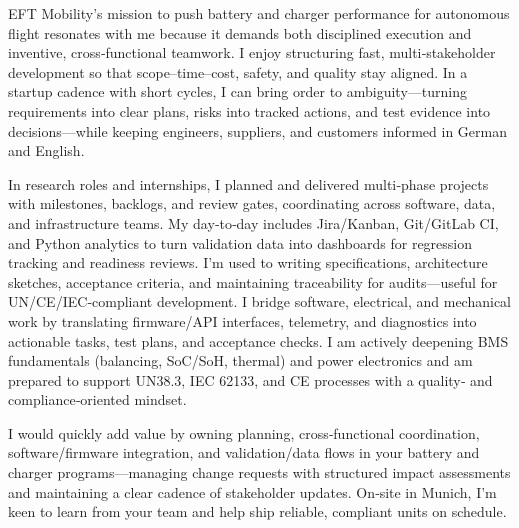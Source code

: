 EFT Mobility’s mission to push battery and charger performance for autonomous flight resonates with me because it demands both disciplined execution and inventive, cross‑functional teamwork. I enjoy structuring fast, multi‑stakeholder development so that scope–time–cost, safety, and quality stay aligned. In a startup cadence with short cycles, I can bring order to ambiguity—turning requirements into clear plans, risks into tracked actions, and test evidence into decisions—while keeping engineers, suppliers, and customers informed in German and English.

In research roles and internships, I planned and delivered multi‑phase projects with milestones, backlogs, and review gates, coordinating across software, data, and infrastructure teams. My day‑to‑day includes Jira/Kanban, Git/GitLab CI, and Python analytics to turn validation data into dashboards for regression tracking and readiness reviews. I’m used to writing specifications, architecture sketches, acceptance criteria, and maintaining traceability for audits—useful for UN/CE/IEC‑compliant development. I bridge software, electrical, and mechanical work by translating firmware/API interfaces, telemetry, and diagnostics into actionable tasks, test plans, and acceptance checks. I am actively deepening BMS fundamentals (balancing, SoC/SoH, thermal) and power electronics and am prepared to support UN38.3, IEC 62133, and CE processes with a quality‑ and compliance‑oriented mindset.

I would quickly add value by owning planning, cross‑functional coordination, software/firmware integration, and validation/data flows in your battery and charger programs—managing change requests with structured impact assessments and maintaining a clear cadence of stakeholder updates. On‑site in Munich, I’m keen to learn from your team and help ship reliable, compliant units on schedule.